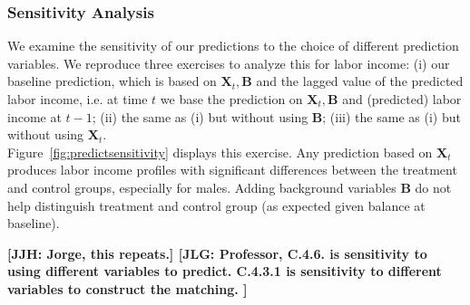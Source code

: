 \subsubsection{Sensitivity Analysis}

\noindent We examine the sensitivity of our predictions to the choice of different prediction variables. We reproduce three exercises to analyze this for labor income: (i) our baseline prediction, which is based on $\bm{X}_{t}, \bm{B}$ and the lagged value of the predicted labor income, i.e. at time $t$ we base the prediction on $\bm{X}_{t}, \bm{B}$ and (predicted) labor income at $t-1$; (ii) the same as (i) but without using $\bm{B}$; (iii) the same as (i) but without using $\bm{X}_{t}$.\\

\noindent Figure~\ref{fig:predictsensitivity} displays this exercise. Any prediction based on $\bm{X}_{t}$ produces labor income profiles with significant differences between the treatment and control groups, especially for males. Adding background variables $\bm{B}$ do not help distinguish treatment and control group (as expected given balance at baseline).

\textbf{[JJH: Jorge, this repeats.] [JLG: Professor, C.4.6. is sensitivity to using different variables to predict. C.4.3.1 is sensitivity to different variables to construct the matching. ]}

